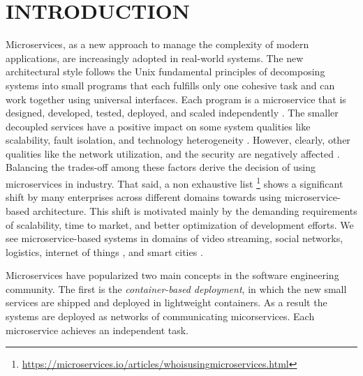 \section{INTRODUCTION}

Microservices, as a new approach to manage the complexity of modern applications, are increasingly adopted in real-world systems. The new architectural style 
follows the Unix fundamental principles  of decomposing systems into small programs \cite{Unix ideas [115]:} that each fulfills only one cohesive task and can work together using universal interfaces. Each program is a microservice that is designed, developed, tested,  deployed, and scaled independently \cite{[Microservices. Martin Fowler(2015)]}. The smaller decoupled services have a positive impact on some system qualities like scalability, fault isolation, and technology heterogeneity \cite{}. However, clearly, other qualities like the network utilization, and the security are negatively affected \cite{ahmadvand2016requirements}.  Balancing the trades-off among these factors derive the decision of using microservices in industry. That said, a non exhaustive list \footnote{\url{https://microservices.io/articles/whoisusingmicroservices.html}} shows a significant shift by many enterprises across different domains towards using microservice-based architecture. This shift is  motivated mainly by the demanding requirements of scalability, time to market, and better optimization of development efforts. We see microservice-based systems in domains of video streaming, social networks, logistics, internet of things \cite{internet}, and smart cities \cite{smartcity}. 

Microservices have popularized two main concepts in the software engineering community. The first is the \textit{container-based deployment}, in which the new small services are shipped and deployed in lightweight containers. As a result the systems are deployed as networks of communicating micorservices. Each microservice achieves an independent task. 

